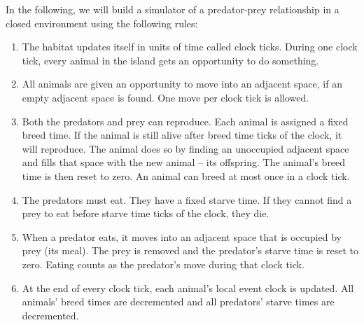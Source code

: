 In the following, we will build a simulator of a predator-prey relationship in a closed environment using the following rules:
\begin{enumerate}
\item The habitat updates itself in units of time called clock ticks. During one clock tick, every animal in the island gets an opportunity to do something.
\item All animals are given an opportunity to move into an adjacent space, if an empty adjacent space is found. One move per clock tick is allowed.
\item Both the predators and prey can reproduce. Each animal is assigned a fixed breed time. If the animal is still alive after breed time ticks of the clock, it will reproduce. The animal does so by finding an unoccupied adjacent space and fills that space with the new animal – its offspring. The animal’s breed time is then reset to zero. An animal can breed at most once in a clock tick.
\item The predators must eat. They have a fixed starve time. If they cannot find a prey to eat before starve time ticks of the clock, they die.
\item When a predator eats, it moves into an adjacent space that is occupied by prey (its meal). The prey is removed and the predator’s starve time is reset to zero. Eating counts as the predator’s move during that clock tick.
\item At the end of every clock tick, each animal’s local event clock is updated. All animals’ breed times are decremented and all predators’ starve times are decremented.
\end{enumerate}

